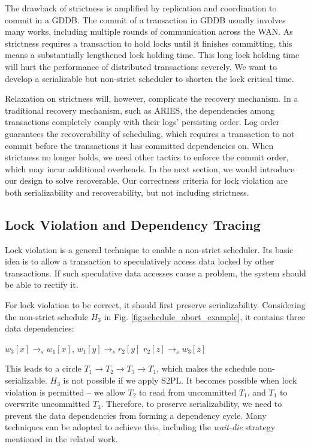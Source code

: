 \documentclass[conference]{IEEEtran}
\begin{document}
The drawback of strictness is amplified by replication and coordination to commit in a GDDB.
The commit of a transaction in GDDB usually involves many works, including multiple rounds of communication across the WAN.
As strictness requires a transaction to hold locks until it finishes committing, this means a substantially lengthened lock holding time. 
This long lock holding time will hurt the performance of distributed transactions severely.
We want to develop a serializable but non-strict scheduler to shorten the lock critical time.

Relaxation on strictness will, however, complicate the recovery mechanism.
In a traditional recovery mechanism, such as ARIES, the dependencies among transactions completely comply with their logs' persisting order. 
Log order guarantees the recoverability of scheduling, which requires a transaction to not commit before the transactions it has committed dependencies on.
When strictness no longer holds, we need other tactics to enforce the commit order, which may incur additional overheads.
In the next section, we would introduce our design to solve recoverable.
Our correctness criteria for lock violation are both serializability and recoverability, but not including strictness.

\subsection{Lock Violation and Dependency Tracing}

Lock violation is a general technique to enable a non-strict scheduler.
Its basic idea is to allow a transaction to speculatively access data locked by other transactions.
If such speculative data accesses cause a problem, the system should be able to rectify it.

For lock violation to be correct, it should first preserve serializability.
Considering the non-strict schedule ${H_3}$ in Fig. \ref{fig:schedule_abort_example},
it contains three data dependencies:

\begin{center}
${w_3[x] \rightarrow _s w_1[x]}$,
${w_1[y] \rightarrow _s r_2[y]}$
${r_2[z] \rightarrow _s w_3[z]}$
\end{center}

This leads to a circle ${T_1 \rightarrow T_2 \rightarrow T_3 \rightarrow T_1}$, which makes the schedule non-serializable.
${H_3}$ is not possible if we apply S2PL. It becomes possible when lock violation is permitted -- we allow
${T_2}$ to read from uncommitted ${T_1}$, and ${T_1}$ to overwrite uncommitted ${T_3}$.
Therefore, to preserve serializability, we need to prevent the data dependencies from forming a dependency cycle.
Many techniques can be adopted to achieve this, including the \emph{wait-die} strategy mentioned in the related work.
\end{document}
